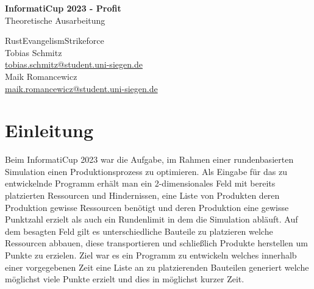\documentclass[12pt,a4paper]{article}
\newcommand{\HRule}{\rule{\linewidth}{0.5mm}}
\begin{document}
\begin{titlepage}
\begin{center}


\vspace*{2cm}
{ \LARGE 
  \textbf{InformatiCup 2023 - Profit}\\[0.4cm]
  Theoretische Ausarbeitung\\
}
\vspace*{2cm}

{ \large
  RustEvangelismStrikeforce\\
    \vspace*{1cm}
  Tobias Schmitz \\ \href{tobias.schmitz@student.uni-siegen.de}{tobias.schmitz@student.uni-siegen.de} \\
  Maik Romancewicz \\ \href{tobias.schmitz@student.uni-siegen.de}{maik.romancewicz@student.uni-siegen.de} \\
}
\vfill



 
\end{center}
\end{titlepage}

\newpage

\tableofcontents
\thispagestyle{empty}
\newpage

\thispagestyle{empty}
\newpage

\setcounter{page}{1}

\section{Einleitung}
Beim InformatiCup 2023 war die Aufgabe, im Rahmen einer rundenbasierten Simulation einen Produktionsprozess zu optimieren. Als Eingabe für das zu entwickelnde Programm erhält man ein 2-dimensionales Feld mit bereits platzierten Ressourcen und Hindernissen, eine Liste von Produkten deren Produktion gewisse Ressourcen benötigt und deren Produktion eine gewisse Punktzahl erzielt als auch ein Rundenlimit in dem die Simulation abläuft. Auf dem besagten Feld gilt es unterschiedliche Bauteile zu platzieren welche Ressourcen abbauen, diese transportieren und schließlich Produkte herstellen um Punkte zu erzielen. Ziel war es ein Programm zu entwickeln welches innerhalb einer vorgegebenen Zeit eine Liste an zu platzierenden Bauteilen generiert welche möglichst viele Punkte erzielt und dies in möglichst kurzer Zeit.
\end{document}
